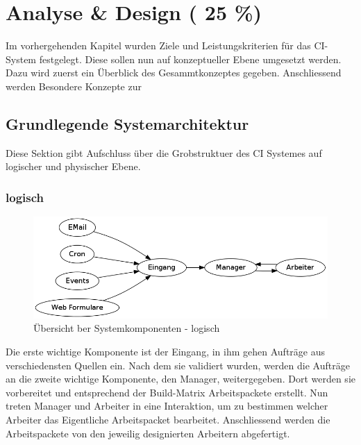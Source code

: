 \chapter{Analyse \& Design ( 25 \%)}
\label{chap:design}


Im vorhergehenden Kapitel wurden Ziele und Leistungskriterien f\"ur das CI-System festgelegt.
Diese sollen nun auf konzeptueller Ebene umgesetzt werden.
Dazu wird zuerst ein \"Uberblick des Gesammtkonzeptes gegeben.
Anschliessend werden Besondere Konzepte zur 


\section{Grundlegende Systemarchitektur}
\label{sec:design:sysarch}
Diese Sektion gibt Aufschluss \"uber die Grobstruktuer des CI Systemes auf logischer und physischer Ebene.

\subsection{logisch}

\begin{figure}[ht]
  \centering
  \label{fig:grob-layout-komponenten-logisch}
  \includegraphics[width=\textwidth]{imageinput/grob-layout-komponenten-logisch.png}
  \caption{\"Ubersicht ber Systemkomponenten - logisch}
\end{figure}


Die erste wichtige Komponente ist der Eingang,
in ihm gehen Auftr\"age aus verschiedensten Quellen ein.
Nach dem sie validiert wurden, werden die Auftr\"age an
die zweite wichtige Komponente, den Manager, weitergegeben.
Dort werden sie vorbereitet und entsprechend der Build-Matrix Arbeitspackete erstellt.
Nun treten Manager und Arbeiter in eine Interaktion,
um zu bestimmen welcher Arbeiter das Eigentliche Arbeitspacket bearbeitet.
Anschliessend werden die Arbeitspackete von den jeweilig designierten Arbeitern abgefertigt.



